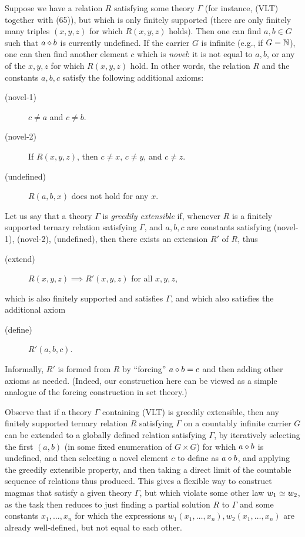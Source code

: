 Suppose we have a relation $R$ satisfying some theory $\Gamma$ (for instance, (VLT) together with (65)), but which is only finitely supported (there are only finitely many triples $(x,y,z)$ for which $R(x,y,z)$ holds).  Then one can find $a,b \in G$ such that $a \diamond b$ is currently undefined.  If the carrier $G$ is infinite (e.g., if $G = \mathbb{N}$), one can then find another element $c$ which is \emph{novel}: it is not equal to $a, b$, or any of the $x,y,z$ for which $R(x,y,z)$ hold. In other words, the relation $R$ and the constants $a,b,c$ satisfy the following additional axioms:
\begin{description}
  \item[(novel-1)] $c \neq a$ and $c \neq b$.
  \item[(novel-2)] If $R(x,y,z)$, then $c \neq x$, $c \neq y$, and $c \neq z$.
  \item[(undefined)]  $R(a,b,x)$ does not hold for any $x$.
\end{description}

Let us say that a theory $\Gamma$ is \emph{greedily extensible} if, whenever $R$ is a finitely supported ternary relation satisfying $\Gamma$, and $a,b,c$ are constants satisfying (novel-1), (novel-2), (undefined), then there exists an extension $R'$ of $R$, thus
\begin{description}
  \item[(extend)] $R(x,y,z) \implies R'(x,y,z)$ for all $x,y,z$,
\end{description}
which is also finitely supported and satisfies $\Gamma$, and which also satisfies the additional axiom
\begin{description}
  \item[(define)] $R'(a,b,c)$.
\end{description}
Informally, $R'$ is formed from $R$ by ``forcing'' $a \diamond b = c$ and then adding other axioms as needed. (Indeed, our construction here can be viewed as a simple analogue of the forcing construction in set theory.)

Observe that if a theory $\Gamma$ containing (VLT) is greedily extensible, then any finitely supported ternary relation $R$ satisfying $\Gamma$ on a countably infinite carrier $G$ can be extended to a globally defined relation satisfying $\Gamma$, by iteratively selecting the first $(a,b)$ (in some fixed enumeration of $G \times G$) for which $a \diamond b$ is undefined, and then selecting a novel element $c$ to define as $a \diamond b$, and applying the greedily extensible property, and then taking a direct limit of the countable sequence of relations thus produced.  This gives a flexible way to construct magmas that satisfy a given theory $\Gamma$, but which violate some other law $w_1 \simeq w_2$, as the task then reduces to just finding a partial solution $R$ to $\Gamma$ and some constants $x_1,\dots,x_n$ for which the expressions $w_1(x_1,\dots,x_n), w_2(x_1,\dots,x_n)$ are already well-defined, but not equal to each other.

